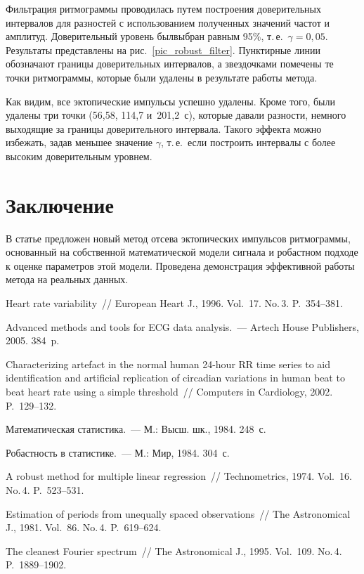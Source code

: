 \begin{multicols}{2}
Фильтрация ритмограммы проводилась путем построения доверительных
интервалов для разностей с использованием полученных значений
час\-тот и амплитуд. Доверительный уровень был\linebreak выбран равным 95\%,
т.\,е.\ $\gamma=0{,}05$. Результаты представлены на
рис.~\ref{pic_robust_filter}. Пунктирные линии обозначают границы
доверительных интервалов, а звездочками помечены те точки
ритмограммы, которые были удалены в результате работы метода.

Как  видим, все эктопические импульсы успешно удалены. Кроме того,
были удалены три точки (56,58, 114,7 и~201,2~с), которые
давали разности, немного выходящие за границы доверительного
интервала. Такого эффекта можно избежать, задав меньшее значение
$\gamma$, т.\,е.\ если построить интервалы с более высоким
доверительным уровнем.

\section{Заключение}%

В  статье предложен новый метод отсева эктопических импульсов
ритмограммы, основанный на собственной математической модели
сигнала и робастном подходе к оценке параметров этой модели.
Проведена демонстрация эффективной работы метода на реальных
данных.

{\small\frenchspacing
{%
\begin{thebibliography}{9}

Heart rate variability~// European Heart
J., 1996. Vol.~17. No.\,3. P.~354--381.

Advanced methods
and tools for ECG data analysis.~--- Artech House Publishers, 2005.
384~p.

Characterizing artefact in the normal human 24-hour RR time series
to aid identification and artificial replication of circadian
variations in human beat to beat heart rate using a simple
threshold~// Computers in Cardiology, 2002. P.~129--132.

Математическая
статистика.~--- М.: Высш. шк., 1984. 248~с.

Робастность в статистике.~--- М.: Мир, 1984. 304~с.

A robust method for multiple linear
regression~// Technometrics, 1974. Vol.~16. No.\,4. P.~523--531.

Estimation of periods from unequally
spaced observations~// The As\-tro\-no\-mi\-cal J., 1981.
Vol.~86. No.\,4. P.~619--624.

\label{end\stat}

The cleanest Fourier spectrum~// The
Astronomical J., 1995. Vol.~109. No.\,4. P.~1889--1902.
\end{thebibliography}

}
}
\end{multicols}